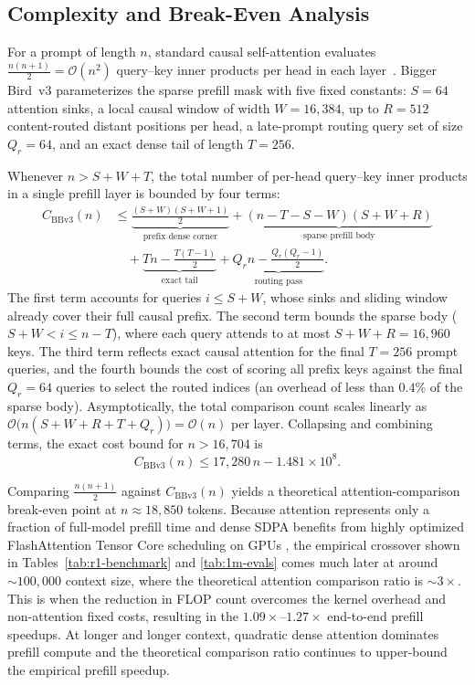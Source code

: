 \documentclass[11pt]{article}
\begin{document}
\subsection{Complexity and Break-Even Analysis}

For a prompt of length $n$, standard causal self-attention evaluates $\frac{n(n+1)}{2} = \mathcal{O}(n^2)$ query--key inner products per head in each layer~\cite{vaswani2017attention}. Bigger Bird~v3 parameterizes the sparse prefill mask with five fixed constants: $S = 64$ attention sinks, a local causal window of width $W = 16{,}384$, up to $R = 512$ content-routed distant positions per head, a late-prompt routing query set of size $Q_r = 64$, and an exact dense tail of length $T = 256$.

Whenever $n > S + W + T$, the total number of per-head query--key inner
products in a single prefill layer is bounded by four terms:
\begin{align}
C_{\mathrm{BBv3}}(n) &\le
  \underbrace{\frac{(S+W)(S+W+1)}{2}}_{\text{prefix dense corner}}
  + \underbrace{(n - T - S - W)(S + W + R)}_{\text{sparse prefill body}} \nonumber \\
  &\quad + \underbrace{Tn - \frac{T(T-1)}{2}}_{\text{exact tail}}
  + \underbrace{Q_r n - \frac{Q_r(Q_r-1)}{2}}_{\text{routing pass}}.
\label{eq:bb-comparisons}
\end{align}
The first term accounts for queries $i \le S + W$, whose sinks and sliding window already cover their full causal prefix. The second term bounds the sparse body ($S + W < i \le n - T$), where each query attends to at most $S + W + R = 16{,}960$ keys. The third term reflects exact causal attention for the final $T = 256$ prompt queries, and the fourth bounds the cost of scoring all prefix keys against the final $Q_r = 64$ queries to select the routed indices (an overhead of less than $0.4\%$ of the sparse body). Asymptotically, the total comparison count scales linearly as $\mathcal{O}\bigl(n(S + W + R + T + Q_r)\bigr) = \mathcal{O}(n)$ per layer. Collapsing and combining terms, the exact cost bound for $n > 16{,}704$ is $$C_{\mathrm{BBv3}}(n) \le 17{,}280\,n - 1.481 \times 10^8.$$

Comparing $\frac{n(n+1)}{2}$ against $C_{\mathrm{BBv3}}(n)$ yields a theoretical attention-comparison break-even point at $n \approx 18{,}850$ tokens. Because attention represents only a fraction of full-model prefill time and dense SDPA benefits from highly optimized FlashAttention Tensor Core scheduling on GPUs \cite{dao2022flashattention}, the empirical crossover shown in Tables~\ref{tab:r1-benchmark} and \ref{tab:1m-evals} comes much later at around $\sim100{,}000$ context size, where the theoretical attention comparison ratio is $\sim3\times$. This is when the reduction in FLOP count overcomes the kernel overhead and non-attention fixed costs, resulting in the $1.09\times$--$1.27\times$ end-to-end prefill speedups. At longer and longer context, quadratic dense attention dominates prefill compute and the theoretical comparison ratio continues to upper-bound the empirical prefill speedup.
\end{document}
